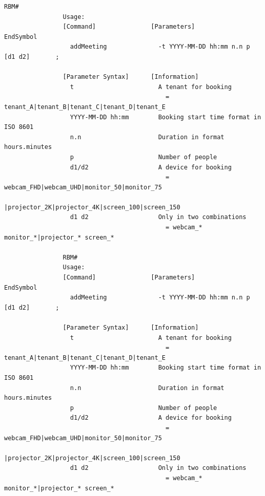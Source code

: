 \documentclass{article}
\begin{document}
\begin{Verbatim}[gobble=8]
                RBM# 
                Usage: 
                [Command]               [Parameters]                            EndSymbol     
                  addMeeting              -t YYYY-MM-DD hh:mm n.n p [d1 d2]       ;           
                
                [Parameter Syntax]      [Information]                                         
                  t                       A tenant for booking                                
                                            = tenant_A|tenant_B|tenant_C|tenant_D|tenant_E    
                  YYYY-MM-DD hh:mm        Booking start time format in ISO 8601               
                  n.n                     Duration in format hours.minutes                    
                  p                       Number of people                                    
                  d1/d2                   A device for booking                                
                                            = webcam_FHD|webcam_UHD|monitor_50|monitor_75     
                                              |projector_2K|projector_4K|screen_100|screen_150
                  d1 d2                   Only in two combinations                            
                                            = webcam_* monitor_*|projector_* screen_*         
                
                RBM# 
                Usage: 
                [Command]               [Parameters]                            EndSymbol     
                  addMeeting              -t YYYY-MM-DD hh:mm n.n p [d1 d2]       ;           
                
                [Parameter Syntax]      [Information]                                         
                  t                       A tenant for booking                                
                                            = tenant_A|tenant_B|tenant_C|tenant_D|tenant_E    
                  YYYY-MM-DD hh:mm        Booking start time format in ISO 8601               
                  n.n                     Duration in format hours.minutes                    
                  p                       Number of people                                    
                  d1/d2                   A device for booking                                
                                            = webcam_FHD|webcam_UHD|monitor_50|monitor_75     
                                              |projector_2K|projector_4K|screen_100|screen_150
                  d1 d2                   Only in two combinations                            
                                            = webcam_* monitor_*|projector_* screen_*         
                

\end{Verbatim}
\end{document}
